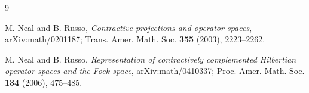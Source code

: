 \documentclass[11pt]{article}
\begin{document}
\begin{thebibliography}{9}

M. Neal and B. Russo,
\emph{Contractive projections and operator spaces},
arXiv:math/0201187; Trans. Amer. Math. Soc. \textbf{355} (2003), 2223--2262.

M. Neal and B. Russo,
\emph{Representation of contractively complemented Hilbertian operator spaces
and the Fock space},
arXiv:math/0410337; Proc. Amer. Math. Soc. \textbf{134} (2006), 475--485.

\end{thebibliography}
\end{document}
